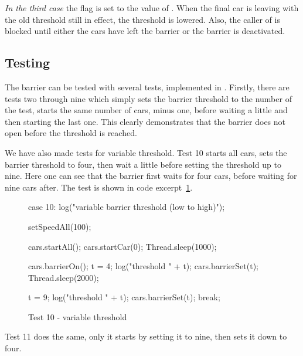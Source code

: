 \emph{In the third case} the flag  is set to
the value of . When the final car is leaving with the old
threshold still in effect, the threshold is lowered. Also, the caller
of  is blocked until either the cars have left the
barrier or the barrier is deactivated.


\subsection{Testing}
\label{sub:bar-test}
The barrier can be tested with several tests, implemented in
. Firstly, there are tests two through nine which simply
sets the barrier threshold to the number of the test, starts the same number of cars, minus
one, before waiting a little and then starting the last one. This
clearly demonstrates that the barrier does not open before the threshold is reached.

We have also made tests for variable threshold. Test 10 starts all
cars, sets the barrier threshold to four, then wait a little before
setting the threshold up to nine. Here one can see that the barrier first
waits for four cars, before waiting for nine cars after. The test is
shown in code excerpt~\ref{lst:bar-test}.

\begin{figure}[H]
\begin{java}
case 10:
    log("variable barrier threshold (low to high)");

    setSpeedAll(100);

    cars.startAll();
    cars.startCar(0);
    Thread.sleep(1000);

    cars.barrierOn();
    t = 4;
    log("threshold " + t);
    cars.barrierSet(t);
    Thread.sleep(2000);

    t = 9;
    log("threshold " + t);
    cars.barrierSet(t);
    break;
\end{java}
\caption{Test 10 - variable threshold}
\label{lst:bar-test}
\end{figure}

Test 11 does the same, only it starts by setting it to nine, then sets
it down to four.
